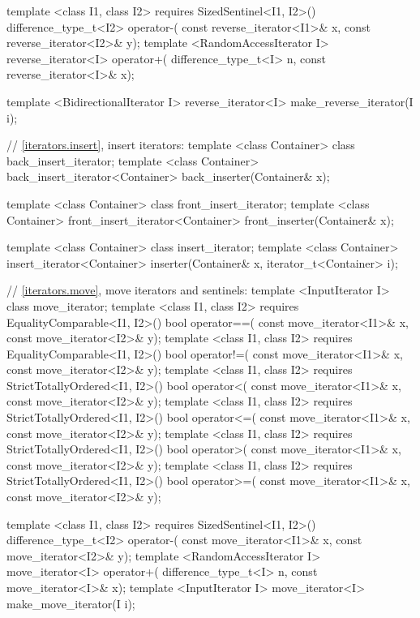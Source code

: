 \begin{codeblock}
{{{{  template <class I1, class I2>
      requires SizedSentinel<I1, I2>()
    difference_type_t<I2> operator-(
      const reverse_iterator<I1>& x,
      const reverse_iterator<I2>& y);
  template <RandomAccessIterator I>
    reverse_iterator<I>
      operator+(
    difference_type_t<I> n,
    const reverse_iterator<I>& x);

  template <BidirectionalIterator I>
    reverse_iterator<I> make_reverse_iterator(I i);

  // \ref{iterators.insert}, insert iterators:
  template <class Container> class back_insert_iterator;
  template <class Container>
    back_insert_iterator<Container> back_inserter(Container& x);

  template <class Container> class front_insert_iterator;
  template <class Container>
    front_insert_iterator<Container> front_inserter(Container& x);

  template <class Container> class insert_iterator;
  template <class Container>
    insert_iterator<Container> inserter(Container& x, iterator_t<Container> i);

  // \ref{iterators.move}, move iterators and sentinels:
  template <InputIterator I> class move_iterator;
  template <class I1, class I2>
      requires EqualityComparable<I1, I2>()
    bool operator==(
      const move_iterator<I1>& x, const move_iterator<I2>& y);
  template <class I1, class I2>
      requires EqualityComparable<I1, I2>()
    bool operator!=(
      const move_iterator<I1>& x, const move_iterator<I2>& y);
  template <class I1, class I2>
      requires StrictTotallyOrdered<I1, I2>()
    bool operator<(
      const move_iterator<I1>& x, const move_iterator<I2>& y);
  template <class I1, class I2>
      requires StrictTotallyOrdered<I1, I2>()
    bool operator<=(
      const move_iterator<I1>& x, const move_iterator<I2>& y);
  template <class I1, class I2>
      requires StrictTotallyOrdered<I1, I2>()
    bool operator>(
      const move_iterator<I1>& x, const move_iterator<I2>& y);
  template <class I1, class I2>
      requires StrictTotallyOrdered<I1, I2>()
    bool operator>=(
      const move_iterator<I1>& x, const move_iterator<I2>& y);

  template <class I1, class I2>
      requires SizedSentinel<I1, I2>()
    difference_type_t<I2> operator-(
      const move_iterator<I1>& x,
      const move_iterator<I2>& y);
  template <RandomAccessIterator I>
    move_iterator<I>
      operator+(
    difference_type_t<I> n,
    const move_iterator<I>& x);
  template <InputIterator I>
    move_iterator<I> make_move_iterator(I i);

}}}}
\end{codeblock}
